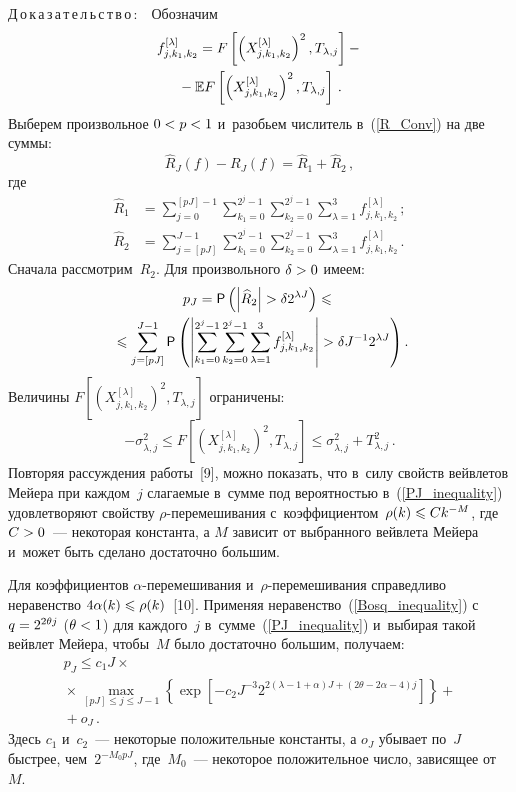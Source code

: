 \begin{multicols}{2}
\noindent
Д\,о\,к\,а\,з\,а\,т\,е\,л\,ь\,с\,т\,в\,о\,:\ \ 
Обозначим 
\begin{multline*}
f_{j,k_1,k_2}^{[\lambda]}= F\left[\left(X_{j,k_1,k_2}^{[\lambda]}\right)^2,
T_{\lambda,j}\right]-{}\\
{}-
\mathbb{E} F\left[\left(X_{j,k_1,k_2}^{[\lambda]}\right)^2,T_{\lambda,j}\right]\,.
\end{multline*} 
Выберем произвольное $0\hm<p\hm<1$ и~разобьем чис\-ли\-тель в~(\ref{R_Conv}) на две суммы:
$$
\widehat{R}_J(f)-R_J(f)=\widehat{R}_1+\widehat{R}_2\,,
$$
 где
\begin{align*}
\widehat{R}_1&=\sum\limits_{j=0}^{[pJ]-1}\sum\limits_{k_1=0}^{2^j-1}
\sum\limits_{k_2=0}^{2^j-1} \sum\limits_{\lambda=1}^3f_{j,k_1,k_2}^{[\lambda]}\,;
\\
\widehat{R}_2&=\sum\limits_{j=[pJ]}^{J-1}\sum\limits_{k_1=0}^{2^j-1}
\sum\limits_{k_2=0}^{2^j-1} \sum\limits_{\lambda=1}^3f_{j,k_1,k_2}^{[\lambda]}\,.
\end{align*}
Сначала рассмотрим~$\widehat{R}_2$. Для произвольного $\delta\hm>0$ имеем:
\begin{multline}
p_J={\sf P}\left(\left\vert\widehat{R}_2\right\vert>\delta2^{\lambda J}\right)\leqslant{}\\
\!{}\leqslant\sum\limits_{j=[pJ]}^{J-1}{\sf P}
\left(\left\vert\sum\limits_{k_1=0}^{2^j-1}\sum\limits_{k_2=0}^{2^j-1}
 \sum\limits_{\lambda=1}^3f_{j,k_1,k_2}^{[\lambda]}\right\vert>\delta J^{-1}2^{\lambda J}\right).\!\!
\label{PJ_inequality}
\end{multline}
Величины $F[(X_{j,k_1,k_2}^{[\lambda]})^2,T_{\lambda,j}]$ ограничены:
$$
-\sigma_{\lambda,j}^2\leqslant F\left[\left(X_{j,k_1,k_2}^{[\lambda]}\right)^2,
T_{\lambda,j}\right]\leqslant\sigma_{\lambda,j}^2+T_{\lambda,j}^2\,.
$$
Повторяя рассуждения работы~[9], можно показать, что в~силу свойств вейвлетов 
Мейера при каждом~$j$ слагаемые в~сумме под вероятностью в~(\ref{PJ_inequality}) 
удовлетворяют свойству $\rho$-пе\-ре\-ме\-ши\-ва\-ния с~коэффициентом~$\rho(k)
\hm\leqslant C k^{-M}$, где $C\hm>0$~--- некоторая константа, а $M$ зависит 
от выбранного вейвлета Мейера и~может быть сделано достаточно большим.


Для коэффициентов $\alpha$-пе\-ре\-ме\-ши\-ва\-ния и~$\rho$-пе\-ре\-ме\-ши\-ва\-ния 
справедливо неравенство $4\alpha(k)\hm \leqslant\rho(k)$~[10]. 
Применяя неравенство~(\ref{Bosq_inequality}) с~$q\hm=2^{2\theta j}$ ($\theta\hm<1$) 
для каждого~$j$ в~сумме~(\ref{PJ_inequality}) и~выбирая такой вейвлет Мейера, 
чтобы~$M$ было достаточно большим, получаем:
\begin{multline}
p_J\leqslant c_1 J\times{}\\
\!{}\times \max\limits_{[pJ]\leqslant j\leqslant J-1}\left\{\!
\exp\left[-c_2J^{-3} 2^{2(\lambda-1+\alpha)J+(2\theta-2\alpha-4)j}\right]\!\right\}+{}\\
{}+o_J\,.
\label{P_inequality}
\end{multline}
Здесь $c_1$ и~$c_2$~--- некоторые положительные константы, а $o_J$ убывает по~$J$ быстрее, 
чем~$2^{-M_0 pJ}$, где~$M_0$~--- некоторое положительное число, зависящее от~$M$.


\end{multicols}
